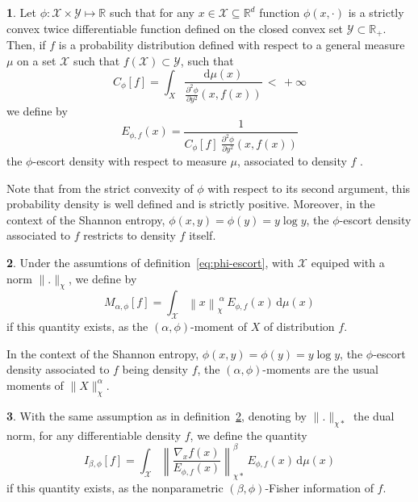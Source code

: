 \documentclass[english,sort&compress]{elsarticle}
\theoremstyle{definition}
\newtheorem{defn}{\protect\definitionname}
\theoremstyle{plain}
\theoremstyle{plain}
\providecommand{\definitionname}{Definition}
\def\dmu{\mathrm{d}\mu}
\def\Rset{\mathbb{R}}
\def\X{\mathcal{X}}
\def\Y{\mathcal{Y}}
\begin{document}
\begin{defn}\label{def:phi-escort}
  Let $\phi: \X \times  \Y \mapsto \Rset$ such that for any  $x \in \X \subseteq
  \Rset^d$ function  $\phi(x,\cdot)$ is  a strictly convex  twice differentiable
  function defined on the closed convex  set $\Y \subset \Rset_+$.  Then, if $f$
  is a probability distribution defined  with respect to a general measure $\mu$
  on a set $\X$ such that $f(\X) \subset \Y$, such that
  \[
  C_\phi[f]    =     \int_X    \frac{\dmu(x)}{\frac{\partial^2    \phi}{\partial
      y^2}(x,f(x))} \, < \, + \infty
  \]
  we define by
  \begin{equation}\label{eq:phi-escort}
    E_{\phi,f}(x) = \frac{1}{\displaystyle C_\phi[f] \: \frac{\partial^2
    \phi}{\partial y^2}(x,f(x))}
  \end{equation}
  the $\phi$-escort density with respect to measure $\mu$, associated to density
  $f$ .
\end{defn}
%
Note  that from  the  strict convexity  of  $\phi$ with  respect  to its  second
argument,   this  probability   density  is   well  defined   and   is  strictly
positive. Moreover, in the context  of the Shannon entropy, $\phi(x,y) = \phi(y)
= y  \log y$, the $\phi$-escort  density associated to $f$  restricts to density
$f$ itself.

\begin{defn}\label{def:phi-moment}
  Under the assumtions of definition~\ref{eq:phi-escort}, with $\X$ equiped with
  a norm $\|.\|_\chi$, we define by
  \begin{equation}\label{eq:phi-moment}
    M_{\alpha,\phi}[f] = \int_\X \left\| x \right\|_\chi^{\: \alpha} \, E_{\phi,f}(x)
    \, \dmu(x)
  \end{equation}
  if this quantity exists, as  the $(\alpha,\phi)$-moment of $X$ of distribution
  $f$.
\end{defn}
%
In the  context of the Shannon  entropy, $\phi(x,y) =  \phi(y) = y \log  y$, the
$\phi$-escort   density    associated   to   $f$   being    density   $f$,   the
$(\alpha,\phi)$-moments are the usual moments of $\|X\|_\chi^\alpha$.

\begin{defn}\label{def:np-phi-Fisher}
  With the  same assumption  as in definition~\ref{def:phi-moment},  denoting by
  $\|.\|_{\chi*}$ the dual  norm, for any differentiable density  $f$, we define
  the quantity
  \begin{equation}\label{eq:np-phi-Fisher}
    I_{\beta,\phi}[f] = \int_\X \left\| \frac{\nabla_x f(x)}{E_{\phi,f}(x)}
    \right\|_{\chi*}^\beta \, E_{\phi,f}(x) \, \dmu(x)
  \end{equation}
  if   this  quantity   exists,  as   the   nonparametric  $(\beta,\phi)$-Fisher
  information of $f$.
\end{defn}
\end{document}
